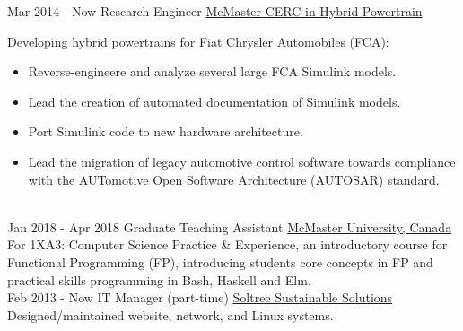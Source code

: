 \documentclass[letterpaper]{twentysecondcv} %
\begin{document}
\vspace{-.5em}
\begin{twenty} %
  \twentyitem
  {Mar 2014 -}
  {Now}
  {Research Engineer}
  {%
    \href{http://hybrid.mcmaster.ca/}{McMaster CERC in Hybrid Powertrain}}
  {}
  {Developing hybrid powertrains for Fiat Chrysler Automobiles (FCA):
  		\begin{itemize}
  			\item Reverse-engineere and analyze several large FCA Simulink models.
  			\item Lead the creation of automated documentation of Simulink models.
     		\item Port Simulink code to new hardware architecture.
			\item Lead the migration of legacy automotive control software towards compliance with the AUTomotive Open Software Architecture (AUTOSAR) standard.
	\end{itemize}}
	\\
  \twentyitem
  {Jan 2018 -}
  {Apr 2018}
  {Graduate Teaching Assistant}
  {\href{https://www.mcmaster.ca/}{McMaster University, Canada}}
  {}
  {For 1XA3: Computer Science Practice \& Experience, an introductory course for Functional Programming (FP), introducing students core concepts in FP and practical skills programming in Bash, Haskell and Elm.
}
	\\
	\twentyitem
	{Feb 2013 -}
	{Now}
	{IT Manager (part-time)}
	{\href{http://www.soltree.net/}{Soltree Sustainable Solutions}}
	{}
  {Designed/maintained website, network, and Linux systems.}
\end{twenty} 
\vspace{-.5em}
\end{document}
